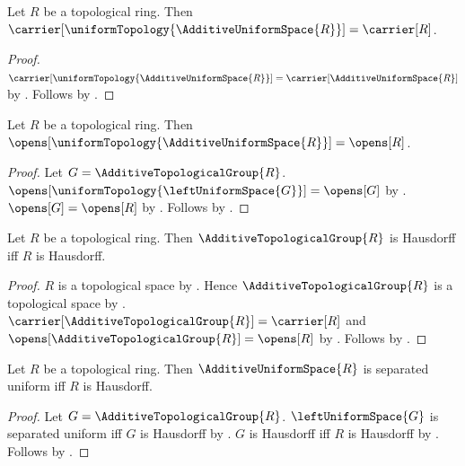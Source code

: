 \begin{proposition}\label{additive_uniform_topology_carrier}
    Let $R$ be a topological ring.
    Then $\carrier[\uniformTopology{\AdditiveUniformSpace{R}}]
        =\carrier[R]$.
\end{proposition}
\begin{proof}
    $\carrier[\uniformTopology{\AdditiveUniformSpace{R}}]
        =\carrier[\AdditiveUniformSpace{R}]$ by
        .
    Follows by .
\end{proof}

\begin{theorem}\label{additive_uniform_topology_opens}
    Let $R$ be a topological ring.
    Then $\opens[\uniformTopology{\AdditiveUniformSpace{R}}]
        =\opens[R]$.
\end{theorem}
\begin{proof}
    Let $G=\AdditiveTopologicalGroup{R}$.
    $\opens[\uniformTopology{\leftUniformSpace{G}}]=\opens[G]$ by
        .
    $\opens[G]=\opens[R]$ by
        .
    Follows by .
\end{proof}

\begin{theorem}\label{additive_topological_group_hausdorff_iff_ring_hausdorff}
    Let $R$ be a topological ring.
    Then $\AdditiveTopologicalGroup{R}$ is Hausdorff iff $R$ is Hausdorff.
\end{theorem}
\begin{proof}
    $R$ is a topological space by
        .
    Hence $\AdditiveTopologicalGroup{R}$ is a topological space by
        .
    $\carrier[\AdditiveTopologicalGroup{R}]=\carrier[R]$ and
        $\opens[\AdditiveTopologicalGroup{R}]=\opens[R]$ by
        .
    Follows by .
\end{proof}

\begin{theorem}\label{additive_uniform_space_separated_iff_hausdorff}
    Let $R$ be a topological ring.
    Then $\AdditiveUniformSpace{R}$ is separated uniform iff
        $R$ is Hausdorff.
\end{theorem}
\begin{proof}
    Let $G=\AdditiveTopologicalGroup{R}$.
    $\leftUniformSpace{G}$ is separated uniform iff $G$ is Hausdorff by
        .
    $G$ is Hausdorff iff $R$ is Hausdorff by
        .
    Follows by .
\end{proof}

